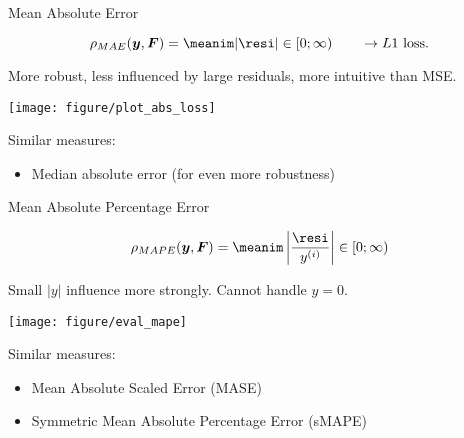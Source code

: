 
\begin{vbframe}{Mean Absolute Error}

$$ 
\rho_{MAE}(\yv, \F) = \meanim \rvert \resi \rvert \in [0;\infty) \qquad \rightarrow L1 
\text{ loss}.
$$

\begin{minipage}[c]{0.33\textwidth}
  \raggedright
  \small
  More robust, less influenced by large residuals, more intuitive than MSE.
\end{minipage}%
\begin{minipage}[c]{0.67\textwidth}
  \begin{knitrout}\scriptsize
  \color{fgcolor}
  {\texttt{[image: figure/plot\_abs\_loss]}}
\end{knitrout}
\end{minipage}

\small
Similar measures:

\begin{itemize}
  \small
  \item Median absolute error (for even more robustness)
\end{itemize}

\end{vbframe}


\begin{vbframe}{Mean Absolute Percentage Error}


$$ 
\rho_{MAPE}(\yv, \F) = \meanim \left\rvert \frac{\resi}{\yi} \right\rvert \in [0;\infty) 
$$

\vfill

\begin{minipage}[c]{0.33\textwidth}
  \raggedright
  \small
  
Small $|y|$ influence more strongly. Cannot handle $y=0$.
\end{minipage}%
\begin{minipage}[c]{0.67\textwidth}
  \begin{knitrout}\scriptsize
  \color{fgcolor}
  {\texttt{[image: figure/eval\_mape]}}
\end{knitrout}
\end{minipage}

\vfill

\small
Similar measures:

\begin{itemize}
  \small
  \item Mean Absolute Scaled Error (MASE)
  \item Symmetric Mean Absolute Percentage Error (sMAPE)
\end{itemize}

\end{vbframe}

